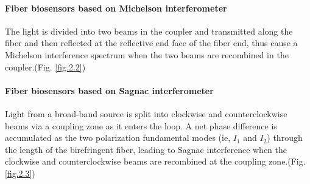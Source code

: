 \documentclass[12pt,a4paper,UTF8]{article}
\begin{document}
        \paragraph{Fiber biosensors based on Michelson interferometer}
        The light is divided into two beams in the coupler and transmitted along the fiber and then reflected at the reflective end face of the fiber end, 
        thus cause a Michelson interference spectrum when the two beams are recombined in the coupler.(Fig. \ref{fig.2.2})
        \paragraph{Fiber biosensors based on Sagnac interferometer}
        Light from a broad-band source is split into clockwise and counterclockwise beams via a coupling zone as it enters the loop. 
        A net phase difference is accumulated as the two polarization fundamental modes (ie, $I_1$ and $I_2$) through the length of the birefringent fiber, leading to Sagnac interference when the clockwise and counterclockwise beams are recombined at the coupling zone.(Fig. \ref{fig.2.3})
\end{document}

